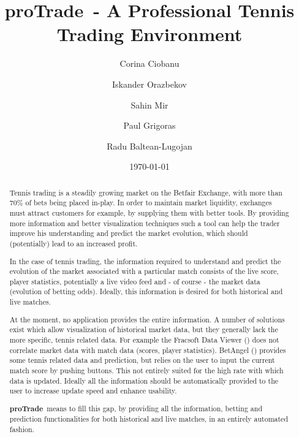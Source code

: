 \documentclass[10pt]{report}
\newcommand{\nm}{{\bf proTrade}}
\newcommand{\nmsp}{{\nm \ }}
\begin{document}
\title{\nmsp - A Professional Tennis Trading Environment}

\author{Corina Ciobanu \and Iskander Orazbekov \and Sahin Mir \and Paul Grigoras \and Radu Baltean-Lugojan}

\date{\today}         %

\maketitle            %

\begin{abstract}
Tennis trading is a steadily growing market on the Betfair Exchange, with more than 70\% of bets being placed in-play. In order to maintain market liquidity, exchanges must attract customers for example, by supplying them with better tools. By providing more information and better visualization techniques such a tool can help the trader improve his understanding and predict the market evolution, which should (potentially) lead to an increased profit.

In the case of tennis trading, the information required to understand and predict the evolution of the market associated with a particular match consists of the live score, player statistics, potentially a live video feed and - of course - the market data (evolution of betting odds). Ideally, this information is desired for both historical and live matches.

At the moment, no application provides the entire information. A number of solutions exist which allow visualization of historical market data, but they generally lack the more specific, tennis related data. For example the Fracsoft Data Viewer (\cite{site-fracsoft}) does not correlate market data with match data (scores, player statistics). BetAngel (\cite{site-betangel}) provides some tennis related data and prediction, but relies on the user to input the current match score by pushing buttons. This not entirely suited for the high rate with which data is updated. Ideally all the information should be automatically provided to the user to increase update speed and enhance usability.

\nmsp means to fill this gap, by providing all the information, betting and prediction functionalities for both historical and live matches, in an entirely automated fashion.

\end{abstract}
\end{document}
